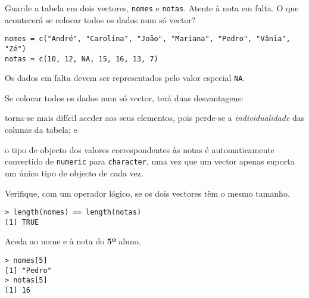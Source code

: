 \documentclass{exam}
\begin{document}
\begin{questions}
\question Guarde a tabela em dois vectores, \texttt{nomes} e \texttt{notas}. Atente à nota em falta. O que acontecerá se colocar todos os dados num só vector?
\begin{solution}
	\begin{verbatim}
nomes = c("André", "Carolina", "João", "Mariana", "Pedro", "Vânia", "Zé")
notas = c(10, 12, NA, 15, 16, 13, 7)
	\end{verbatim}
	Os dados em falta devem ser representados pelo valor especial \texttt{NA}.
	
	Se colocar todos os dados num só vector, terá duas desvantagens:
	\begin{inparaenum}
		\item torna-se mais difícil aceder aos seus elementos, pois perde-se a \textit{individualidade} das colunas da tabela; e
		\item o tipo de objecto dos valores correspondentes às notas é automaticamente convertido de \texttt{numeric} para \texttt{character}, uma vez que um vector apenas suporta um único tipo de objecto de cada vez.
	\end{inparaenum}
\end{solution}

\question Verifique, com um operador lógico, se os dois vectores têm o mesmo tamanho.
\begin{solution}
	\begin{verbatim}
> length(nomes) == length(notas)
[1] TRUE
	\end{verbatim}
\end{solution}

\question Aceda ao nome e à nota do \textbf{5º} aluno.
\begin{solution}
	\begin{verbatim}
> nomes[5]
[1] "Pedro"
> notas[5]
[1] 16
	\end{verbatim}
\end{solution}


\end{questions}
\end{document}
